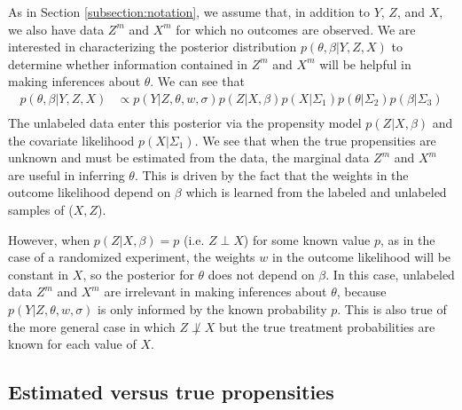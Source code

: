 \documentclass[aos]{imsart}
\begin{document}
As in Section \ref{subsection:notation}, we assume that, in addition to $Y$, $Z$, and $X$, we also have data $Z^m$ and $X^m$ for which no outcomes are observed. 
We are interested in characterizing the posterior distribution $p(\theta, \beta | Y, Z, X)$ to determine whether information contained in $Z^m$ and $X^m$ will be helpful 
in making inferences about $\theta$. We can see that 
\begin{equation*}
\begin{aligned}
p(\theta, \beta | Y, Z, X) & \propto p(Y | Z, \theta, w, \sigma) p(Z | X, \beta) p(X | \Sigma_1) p(\theta | \Sigma_2) p(\beta | \Sigma_3)\\
\end{aligned}
\end{equation*}
The unlabeled data enter this posterior via the propensity model $p(Z | X, \beta)$ and the covariate likelihood $p(X | \Sigma_1)$.
We see that when the true propensities are unknown and must be estimated from the data, the marginal data $Z^m$ and $X^m$ are useful in inferring $\theta$. 
This is driven by the fact that the weights in the outcome likelihood depend on $\beta$ which is learned from the labeled and unlabeled samples of ($X, Z$).

However, when $p(Z | X, \beta) = p$ (i.e. $Z \perp X$) for some known value $p$, as in the case of a randomized experiment, the weights $w$ in the outcome 
likelihood will be constant in $X$, so the posterior for $\theta$ does not depend on $\beta$.
In this case, unlabeled data $Z^m$ and $X^m$ are irrelevant in making inferences about $\theta$, because $p(Y | Z, \theta, w, \sigma)$ is only informed by the known 
probability $p$. This is also true of the more general case in which $Z \not\perp X$ but the true treatment probabilities are known for each value of $X$.

\subsection{Estimated versus true propensities}
\label{subsection:estimatedprop}
\end{document}
